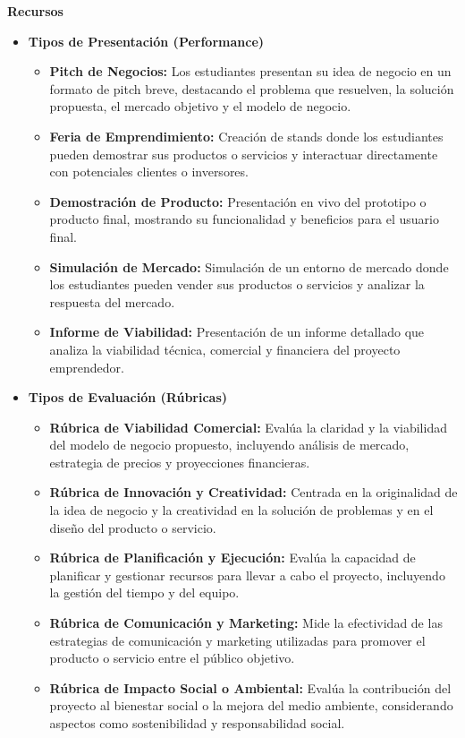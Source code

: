 {\large \textbf{Recursos}}
\begin{itemize}
    \item \textbf{Tipos de Presentación (Performance)}
    \begin{itemize}
        \item \textbf{Pitch de Negocios:}
        Los estudiantes presentan su idea de negocio en un formato de pitch breve, destacando el problema que resuelven, la solución propuesta, el mercado objetivo y el modelo de negocio.
        \item \textbf{Feria de Emprendimiento:}
        Creación de stands donde los estudiantes pueden demostrar sus productos o servicios y interactuar directamente con potenciales clientes o inversores.
        \item \textbf{Demostración de Producto:}
        Presentación en vivo del prototipo o producto final, mostrando su funcionalidad y beneficios para el usuario final.
        \item \textbf{Simulación de Mercado:}
        Simulación de un entorno de mercado donde los estudiantes pueden vender sus productos o servicios y analizar la respuesta del mercado.
        \item \textbf{Informe de Viabilidad:}
        Presentación de un informe detallado que analiza la viabilidad técnica, comercial y financiera del proyecto emprendedor.
    \end{itemize}
    \item \textbf{Tipos de Evaluación (Rúbricas)}
    \begin{itemize}
        \item \textbf{Rúbrica de Viabilidad Comercial:}
        Evalúa la claridad y la viabilidad del modelo de negocio propuesto, incluyendo análisis de mercado, estrategia de precios y proyecciones financieras.
        \item \textbf{Rúbrica de Innovación y Creatividad:}
        Centrada en la originalidad de la idea de negocio y la creatividad en la solución de problemas y en el diseño del producto o servicio.
        \item \textbf{Rúbrica de Planificación y Ejecución:}
        Evalúa la capacidad de planificar y gestionar recursos para llevar a cabo el proyecto, incluyendo la gestión del tiempo y del equipo.
        \item \textbf{Rúbrica de Comunicación y Marketing:}
        Mide la efectividad de las estrategias de comunicación y marketing utilizadas para promover el producto o servicio entre el público objetivo.
        \item \textbf{Rúbrica de Impacto Social o Ambiental:}
        Evalúa la contribución del proyecto al bienestar social o la mejora del medio ambiente, considerando aspectos como sostenibilidad y responsabilidad social.
    \end{itemize}
\end{itemize}




